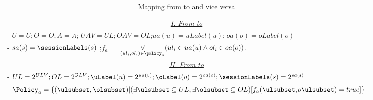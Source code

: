 \begin{table}
	\centering
	\caption{ Mapping from \EPOneOneModels{} to \LPOneOne{} and vice versa } %
	\label{tab:lp11-to-ep11}
		\begin{tabular}{|l|}						
		\hline		
	\multicolumn{1}{|c|}{\underline{\textit{I. From \EPOneOneModels{} to \LPOneOne{} }}}\\					
	- $U  = U ; O  = O ; A  = A $; $UAV	= UL; OAV = OL$;$ua(u) = uLabel(u)$; $oa(o)=oLabel(o) $\\
	-  $sa(s) = \sessionLabels(s) $ ;$f_a =$ $\mathop{\vee}\limits_{ (ul_i, ol_i) \in \policy_a} ( ul_i \in ua(u) \land ol_i \in oa(o))$. \\
	 
	 \multicolumn{1}{|c|}{\underline{\textit{II. From \LPOneOne{} to \EPOneOneModels{}}}}\\	
	  - $UL= 2^{ULV}; OL= 2^{OLV}; \uLabel(u) = 2^{ua(u)};\oLabel(o) = 2^{oa(o)}; \sessionLabels(s) = 2^{sa(s)}$ \\	  
	 - $\Policy_a = \{  (\ulsubset, \olsubset) | (\exists \ulsubset \subseteq UL, \exists \olsubset \subseteq OL)[ f_a(\ulsubset, o\ulsubset) = true] \} $

		 \\ \hline	
	\end{tabular}
	
\end{table}


